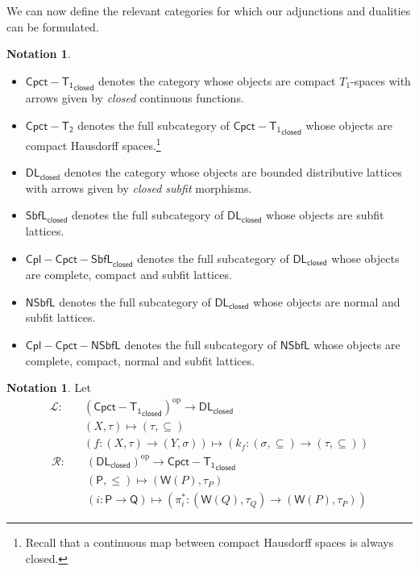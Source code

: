 \documentclass{article}
\newcommand{\corn}[1]{(\mathsf{W}(#1),\tau_{#1})}
\theoremstyle{plain}
\theoremstyle{definition}
\newtheorem{notation}[theorem]{Notation}
\theoremstyle{remark}
\newcommand{\bool}[1]{\mathsf{#1}}
\newcommand{\0}{\mathbbm 0}
\newcommand{\1}{\mathbbm 1}
\newcommand{\2}{\mathbbm 2}
\begin{document}
We can now define the relevant categories for which our adjunctions and dualities can be formulated.

\begin{notation}
\emph{}
\begin{itemize}
\item
\label{not:compt1}
$\bool{Cpct-T_1}_\bool{closed}$ denotes the category whose objects are compact $T_1$-spaces with arrows given by \emph{closed} continuous functions.
\item
\label{not:compt2}
$\bool{Cpct-T_2}$ denotes the full subcategory of $\bool{Cpct-T_1}_\bool{closed}$ whose objects are compact Hausdorff spaces.\footnote{Recall that a continuous map between compact Hausdorff spaces is always closed.}

\item
\label{not:los}
$\bool{DL}_\bool{closed} $ denotes the category whose objects are bounded distributive lattices with arrows given by \emph{closed subfit} morphisms. 

\item 
\label{not:cclos}
$\bool{SbfL}_\bool{closed} $ denotes the full subcategory of $\bool{DL}_\bool{closed} $ whose objects are subfit lattices.

\item 
\label{not:cclos}
$\bool{Cpl-Cpct-SbfL}_\bool{closed} $ denotes the full subcategory of $\bool{DL}_\bool{closed} $ whose objects are complete, compact and subfit lattices.

\item
\label{not:nlos}$\bool{NSbfL}$ denotes the full subcategory of $\bool{DL}_\bool{closed} $ whose objects are normal and subfit lattices.

\item 
\label{not:ccnlos}
$\bool{Cpl-Cpct-NSbfL}$ denotes the full subcategory of $\bool{NSbfL}$ whose objects are complete, compact, normal and subfit lattices. 
\end{itemize}
\end{notation}



\begin{notation}
\label{not:functors}
Let
\begin{align*}
\mathcal{L}: & \quad (\bool{Cpct-T_1}_\bool{closed})^\mathrm{op} \to \bool{DL}_\bool{closed}  \\
& \quad (X, \tau) \mapsto (\tau, \subseteq) \\
& \quad (f: (X, \tau) \to (Y, \sigma)) \mapsto (k_f: (\sigma, \subseteq) \to (\tau, \subseteq))
\end{align*}
\quad \quad \quad
\begin{align*}
\mathcal{R}: & \quad (\bool{DL}_\bool{closed} )^\mathrm{op} \to \bool{Cpct-T_1}_\bool{closed} \\
& \quad (\bool{P}, \leq) \mapsto \corn{P} \\
& \quad (i: \bool{P} \to \bool{Q}) \mapsto (\pi^*_i: \corn{Q} \to \corn{P})
\end{align*}
\end{notation}
\end{document}
